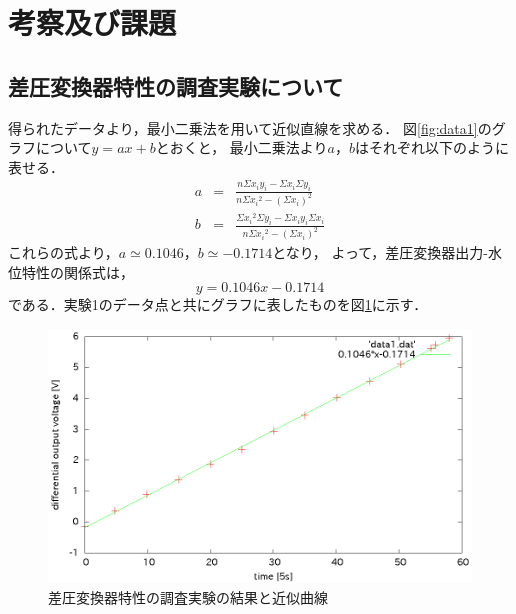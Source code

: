 \documentclass[11pt,a4paper]{jsarticle}
\begin{document}
\newpage

 \section{考察及び課題}
  \subsection{差圧変換器特性の調査実験について}
  得られたデータより，最小二乗法を用いて近似直線を求める．
図\ref{fig:data1}のグラフについて$y = a x + b$とおくと，
最小二乗法より$a$，$b$はそれぞれ以下のように表せる．
\begin{eqnarray}
  a &=& \frac{n \Sigma x_i y_i - \Sigma x_i \Sigma y_i}{n \Sigma {x_i}^2 - ( \Sigma x_i )^2} \\
  b &=& \frac{\Sigma {x_i}^2 \Sigma y_i - \Sigma x_i y_i \Sigma x_i}{n \Sigma {x_i}^2 - ( \Sigma x_i )^2}
\end{eqnarray}
これらの式より，$a \simeq 0.1046$，$b \simeq -0.1714$となり，
よって，差圧変換器出力-水位特性の関係式は，
\begin{equation}
  y = 0.1046x - 0.1714
\end{equation}
である．実験1のデータ点と共にグラフに表したものを図\ref{fig6}に示す．

\newpage

\begin{figure}[htb]
 \begin{center}
  \includegraphics[scale = 1]{./picture/data1_2.eps}
 \end{center}
\caption{差圧変換器特性の調査実験の結果と近似曲線}
\label{fig6}
\end{figure}

\newpage

\thispagestyle{fancy}
\cfoot{}
\end{document}
